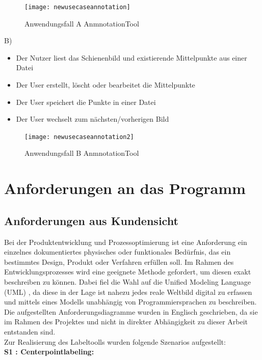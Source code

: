 \documentclass[11pt]{scrartcl}
\begin{document}
\begin{figure}[H]
  \texttt{[image: newusecaseannotation]}
  \caption{Anwendungsfall A AnmnotationTool}
\end{figure}

B)
\begin{itemize}
	\item Der Nutzer liest das Schienenbild und existierende Mittelpunkte aus einer Datei
	\item Der User erstellt, löscht oder bearbeitet die Mittelpunkte
	\item Der User speichert die Punkte in einer Datei
	\item Der User wechselt zum nächsten/vorherigen Bild
\end{itemize}

\begin{figure}[H]
  \texttt{[image: newusecaseannotation2]}
  \caption{Anwendungsfall B AnmnotationTool}
\end{figure}

\section{Anforderungen an das Programm }
\label{sec:Anforderungen an das Programmn}
\subsection{Anforderungen aus Kundensicht}
\label{sec:Anforderungen aus Kundensicht}

\noindent
Bei der Produktentwicklung und Prozessoptimierung ist eine Anforderung ein einzelnes dokumentiertes physisches oder funktionales Bedürfnis, das ein bestimmtes Design, Produkt oder Verfahren erfüllen soll. Im Rahmen des Entwicklungsprozesses wird eine geeignete Methode gefordert, um diesen exakt beschreiben zu können. Dabei fiel die Wahl auf die Unified Modeling Language (UML) , da diese in der Lage ist nahezu jedes reale Weltbild digital zu erfassen und mittels eines Modells unabhängig von Programmiersprachen zu beschreiben. Die aufgestellten Anforderungsdiagramme wurden in Englisch geschrieben, da sie im Rahmen des Projektes und nicht in direkter Abhängigkeit zu dieser Arbeit entstanden sind. 
\\

\noindent
Zur Realisierung des Labeltoolls wurden folgende Szenarios  aufgestellt:
\\

\noindent
\textbf{S1 : Centerpointlabeling:} 
	
\end{document}
